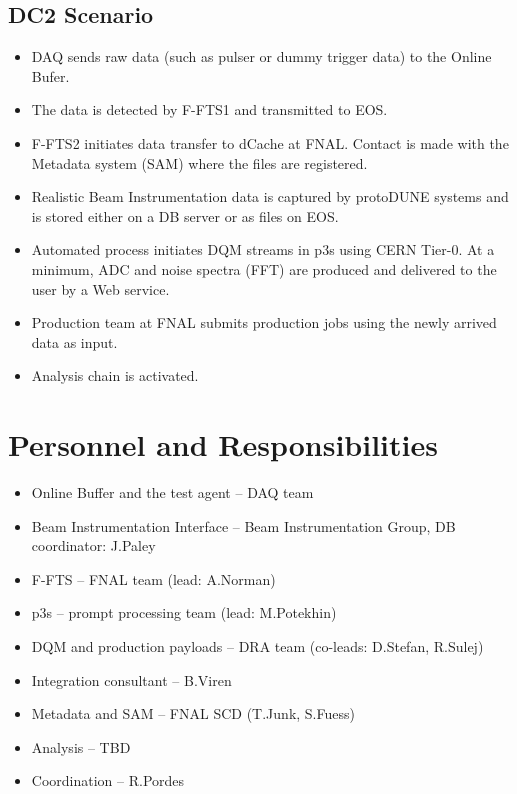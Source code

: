 \documentclass[pdftex,12pt,letter]{article}
\newcommand{\pd}{protoDUNE\xspace}
\begin{document}
\subsection{DC2 Scenario}

\begin{itemize}

\item DAQ sends raw data (such as pulser or dummy trigger data) to the Online Bufer.

\item The data is detected by F-FTS1 and transmitted to EOS.

\item F-FTS2 initiates data transfer to dCache at FNAL. Contact is made with the Metadata system (SAM) where the files
are registered.

\item Realistic Beam Instrumentation data is captured by \pd systems and is stored either on a DB server or as files on EOS.

\item Automated process initiates DQM streams in p3s using  CERN Tier-0. At a minimum, ADC and noise spectra (FFT) are produced
and delivered to the user by a Web service.

\item Production team at FNAL submits production jobs using the newly arrived data as input.

\item Analysis chain is activated.

\end{itemize}


\section{Personnel and Responsibilities}

\begin{itemize}

\item Online Buffer and the test agent -- DAQ team

\item Beam Instrumentation Interface -- Beam Instrumentation Group, DB coordinator: J.Paley

\item F-FTS -- FNAL team (lead: A.Norman)

\item p3s -- prompt processing team (lead: M.Potekhin)

\item DQM and production payloads -- DRA team (co-leads: D.Stefan, R.Sulej)

\item Integration consultant -- B.Viren

\item Metadata and SAM -- FNAL SCD (T.Junk, S.Fuess)

\item Analysis -- TBD

\item Coordination -- R.Pordes


\end{itemize}
\end{document}
